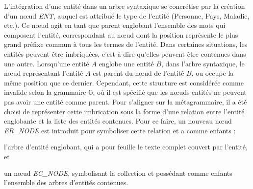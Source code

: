 L'intégration d'une entité dans un arbre syntaxique se concrétise par la création d'un nœud \emph{ENT}, auquel est attribué le type de l'entité (Personne, Pays, Maladie, etc.).
Ce nœud agit en tant que parent englobant l'ensemble des mots qui composent l'entité, correspondant au nœud dont la position représente le plus grand préfixe commun à tous les termes de l'entité.
Dans certaines situations, les entités peuvent être imbriquées, c'est-à-dire qu'elles peuvent être contenues dans une autre.
Lorsqu'une entité $A$ englobe une entité $B$, dans l'arbre syntaxique, le nœud représentant l'entité $A$ est parent du nœud de l'entité $B$, ou occupe la même position que ce dernier.
Cependant, cette structure est considérée comme invalide selon la grammaire $\mathbb{G}$, où il est spécifié que les nœuds entités ne peuvent pas avoir une entité comme parent.
Pour s'aligner sur la métagrammaire, il a été choisi de représenter cette imbrication sous la forme d'une relation entre l'entité englobante et la liste des entités contenues.
Pour ce faire, un nouveau nœud \emph{ER\_NODE} est introduit pour symboliser cette relation et a comme enfants :
\begin{enumerate*}[label=(\roman*)]
    \item l'arbre d'entité englobant, qui a pour feuille le texte complet couvert par l'entité, et
    \item un nœud \emph{EC\_NODE}, symbolisant la collection et possédant comme enfants l'ensemble des arbres d'entités contenues.
\end{enumerate*}

